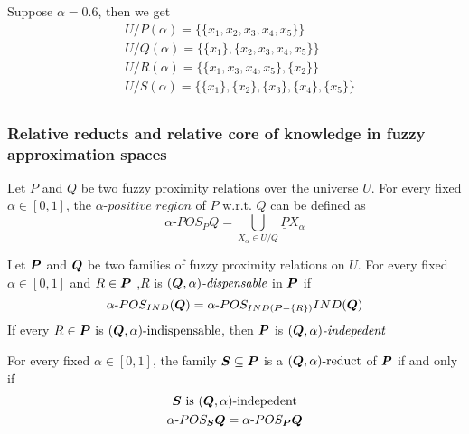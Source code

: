 \documentclass[11pt]{article}
\begin{document}
Suppose \(\alpha=0.6\), then we get
\begin{align*}
  &U/P(\alpha)=\{\{x_1,x_2,x_3,x_4,x_5\}\}\\
  &U/Q(\alpha)=\{\{x_1\},\{x_2,x_3,x_4,x_5\}\}\\
  &U/R(\alpha)=\{\{x_1,x_3,x_4,x_5\},\{x_2\}\}\\
  &U/S(\alpha)=\{\{x_1\},\{x_2\},\{x_3\},\{x_4\},\{x_5\}\}\\
\end{align*}
\subsubsection{Relative reducts and relative core of knowledge in fuzzy approximation spaces}
\label{sec:org36721be}
\begin{definition}[]
Let \(P\) and \(Q\) be two fuzzy proximity relations over the universe \(U\). For
every fixed \(\alpha\in[0,1]\), the \(\alpha\textit{-positive region}\) of \(P\) w.r.t. \(Q\)
can be defined as
\begin{equation*}
\alpha\text{-}POS_P Q=\displaystyle\bigcup_{X_\alpha\in U/Q} \underline{P}X_\alpha
\end{equation*}
\end{definition}
\begin{definition}[]
Let \(\boldsymbol{P}\) and \(\boldsymbol{Q}\) be two families of fuzzy proximity relations on \(U\). For
every fixed \(\alpha\in [0,1]\) and \(R\in \boldsymbol{P}\) ,\(R\) is
\((\boldsymbol{Q},\alpha)\textit{-dispensable}\) in \(\boldsymbol{P}\) if 
\begin{equation*}
\alpha\text{-}POS_{IND} (\boldsymbol{Q})=\alpha\text{-}POS_{IND(\boldsymbol{P}-\left\{ R\right\})}IND(\boldsymbol{Q})
\end{equation*}
If every \(R\in\boldsymbol{P}\) is \((\boldsymbol{Q},\alpha)\text{-indispensable}\), then \(\boldsymbol{P}\) is 
\((\boldsymbol{Q},\alpha)\textit{-indepedent}\)
\end{definition}
\begin{definition}[]
For every fixed \(\alpha\in[0,1]\), the family \(\boldsymbol{S}\subseteq\boldsymbol{P}\) is a 
\((\boldsymbol{Q},\alpha)\text{-reduct}\) of \(\boldsymbol{P}\) if and only if
\begin{gather*}
\boldsymbol{S}\text{ is } (\boldsymbol{Q},\alpha)\text{-indepedent}\\
\alpha\text{-}POS_{\boldsymbol{S}}\boldsymbol{Q}=\alpha\text{-}POS_{\boldsymbol{P}}\boldsymbol{Q}
\end{gather*}
\end{definition}
\end{document}
